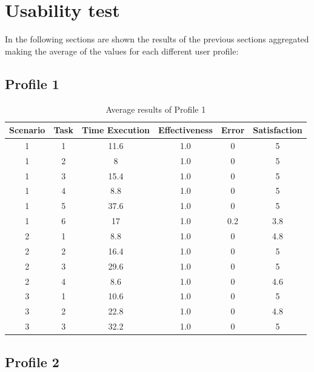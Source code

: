 \section{Usability test}
In the following sections are shown the results of the previous sections aggregated making the average of the values for each different user profile:

\subsection{Profile 1}
\begin{table}[H]
  \begin{center}
    \begin{tabular}{||c|c|c|c|c|c||} %
      \textbf{Scenario} & \textbf{Task} & \textbf{Time Execution} & \textbf{Effectiveness} & \textbf{Error} & \textbf{Satisfaction}\\
      
      \hline
        1 & 1 & 11.6 & 1.0 & 0 & 5\\
        1 & 2 & 8 & 1.0 & 0 & 5\\
        1 & 3 & 15.4 & 1.0 & 0 & 5\\
        1 & 4 & 8.8 & 1.0 & 0 & 5\\
        1 & 5 & 37.6 & 1.0 & 0 & 5\\
        1 & 6 & 17 & 1.0 & 0.2 & 3.8\\
        \hline
        2 & 1 & 8.8 & 1.0 & 0 & 4.8\\
        2 & 2 & 16.4 & 1.0 & 0 & 5\\
        2 & 3 & 29.6 & 1.0 & 0 & 5\\
        2 & 4 & 8.6 & 1.0 & 0 & 4.6\\
        \hline
        3 & 1 & 10.6 & 1.0 & 0 & 5\\
        3 & 2 & 22.8 & 1.0 & 0 & 4.8\\
        3 & 3 & 32.2 & 1.0 & 0 & 5\\
        \hline

    \end{tabular}
  \end{center}
  \caption{Average results of Profile 1}
\end{table}

\subsection{Profile 2}



